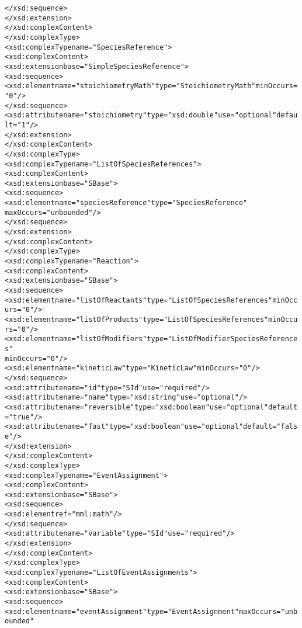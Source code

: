 \begin{alltt}
                </xsd:sequence>
            </xsd:extension>
        </xsd:complexContent>
    </xsd:complexType>
    <xsd:complexType name="SpeciesReference">
        <xsd:complexContent>
            <xsd:extension base="SimpleSpeciesReference">
                <xsd:sequence>
                    <xsd:element name="stoichiometryMath" type="StoichiometryMath" minOccurs="0"/>
                </xsd:sequence>
                <xsd:attribute name="stoichiometry" type="xsd:double" use="optional" default="1"/>
            </xsd:extension>
        </xsd:complexContent>
    </xsd:complexType>
    <xsd:complexType name="ListOfSpeciesReferences">
        <xsd:complexContent>
            <xsd:extension base="SBase">
                <xsd:sequence>
                    <xsd:element name="speciesReference" type="SpeciesReference"
                        maxOccurs="unbounded"/>
                </xsd:sequence>
            </xsd:extension>
        </xsd:complexContent>
    </xsd:complexType>
    <xsd:complexType name="Reaction">
        <xsd:complexContent>
            <xsd:extension base="SBase">
                <xsd:sequence>
                    <xsd:element name="listOfReactants" type="ListOfSpeciesReferences" minOccurs="0"/>
                    <xsd:element name="listOfProducts" type="ListOfSpeciesReferences" minOccurs="0"/>
                    <xsd:element name="listOfModifiers" type="ListOfModifierSpeciesReferences"
                        minOccurs="0"/>
                    <xsd:element name="kineticLaw" type="KineticLaw" minOccurs="0"/>
                </xsd:sequence>
                <xsd:attribute name="id" type="SId" use="required"/>
                <xsd:attribute name="name" type="xsd:string" use="optional"/>
                <xsd:attribute name="reversible" type="xsd:boolean" use="optional" default="true"/>
                <xsd:attribute name="fast" type="xsd:boolean" use="optional" default="false"/>
            </xsd:extension>
        </xsd:complexContent>
    </xsd:complexType>
    <xsd:complexType name="EventAssignment">
        <xsd:complexContent>
            <xsd:extension base="SBase">
                <xsd:sequence>
                    <xsd:element ref="mml:math"/>
                </xsd:sequence>
                <xsd:attribute name="variable" type="SId" use="required"/>
            </xsd:extension>
        </xsd:complexContent>
    </xsd:complexType>
    <xsd:complexType name="ListOfEventAssignments">
        <xsd:complexContent>
            <xsd:extension base="SBase">
                <xsd:sequence>
                    <xsd:element name="eventAssignment" type="EventAssignment" maxOccurs="unbounded"

\end{alltt}
